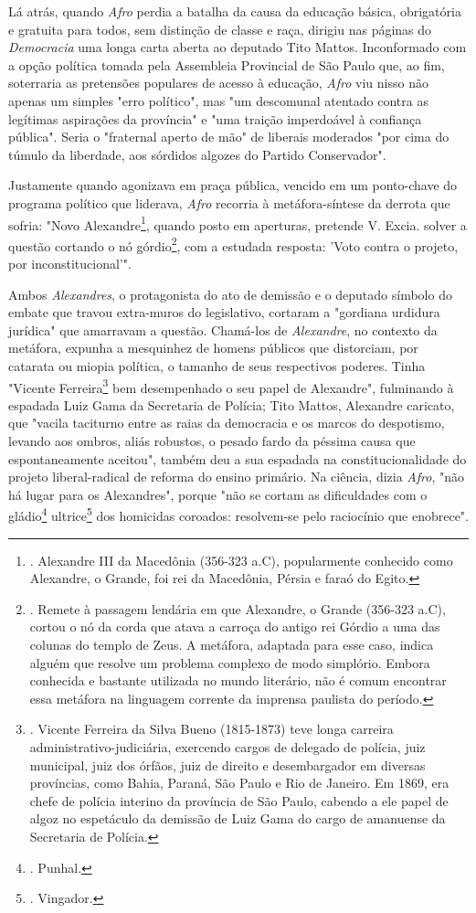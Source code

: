Lá atrás, quando \emph{Afro} perdia a batalha da causa da educação
básica, obrigatória e gratuita para todos, sem distinção de classe e
raça, dirigiu nas páginas do \emph{Democracia} uma longa carta aberta ao
deputado Tito Mattos. Inconformado com a opção política tomada pela
Assembleia Provincial de São Paulo que, ao fim, soterraria as pretensões
populares de acesso à educação, \emph{Afro} viu nisso não apenas um
simples "erro político", mas "um descomunal atentado contra as legítimas
aspirações da província" e "uma traição imperdoável à confiança
pública". Seria o "fraternal aperto de mão" de liberais moderados "por
cima do túmulo da liberdade, aos sórdidos algozes do Partido
Conservador".

Justamente quando agonizava em praça pública, vencido em um ponto-chave
do programa político que liderava, \emph{Afro} recorria à
metáfora-síntese da derrota que sofria: "Novo Alexandre\footnote{.
  Alexandre III da Macedônia (356-323 a.C), popularmente conhecido como
  Alexandre, o Grande, foi rei da Macedônia, Pérsia e faraó do Egito.},
quando posto em aperturas, pretende V. Excia. solver a questão cortando
o nó górdio\footnote{. Remete à passagem lendária em que Alexandre, o
  Grande (356-323 a.C), cortou o nó da corda que atava a carroça do
  antigo rei Górdio a uma das colunas do templo de Zeus. A metáfora,
  adaptada para esse caso, indica alguém que resolve um problema
  complexo de modo simplório. Embora conhecida e bastante utilizada no
  mundo literário, não é comum encontrar essa metáfora na linguagem
  corrente da imprensa paulista do período.}, com a estudada resposta:
'Voto contra o projeto, por inconstitucional'".

Ambos \emph{Alexandres}, o protagonista do ato de demissão e o deputado
símbolo do embate que travou extra-muros do legislativo, cortaram a
"gordiana urdidura jurídica" que amarravam a questão. Chamá-los de
\emph{Alexandre}, no contexto da metáfora, expunha a mesquinhez de
homens públicos que distorciam, por catarata ou miopia política, o
tamanho de seus respectivos poderes. Tinha "Vicente Ferreira\footnote{.
  Vicente Ferreira da Silva Bueno (1815-1873) teve longa carreira
  administrativo-judiciária, exercendo cargos de delegado de polícia,
  juiz municipal, juiz dos órfãos, juiz de direito e desembargador em
  diversas províncias, como Bahia, Paraná, São Paulo e Rio de Janeiro.
  Em 1869, era chefe de polícia interino da província de São Paulo,
  cabendo a ele papel de algoz no espetáculo da demissão de Luiz Gama do
  cargo de amanuense da Secretaria de Polícia.} bem desempenhado o seu
papel de Alexandre", fulminando à espadada Luiz Gama da Secretaria de
Polícia; Tito Mattos, Alexandre caricato, que "vacila taciturno entre as
raias da democracia e os marcos do despotismo, levando aos ombros, aliás
robustos, o pesado fardo da péssima causa que espontaneamente aceitou",
também deu a sua espadada na constitucionalidade do projeto
liberal-radical de reforma do ensino primário. Na ciência, dizia
\emph{Afro}, "não há lugar para os Alexandres", porque "não se cortam as
dificuldades com o gládio\footnote{. Punhal.} ultrice\footnote{.
  Vingador.} dos homicidas coroados: resolvem-se pelo raciocínio que
enobrece".

